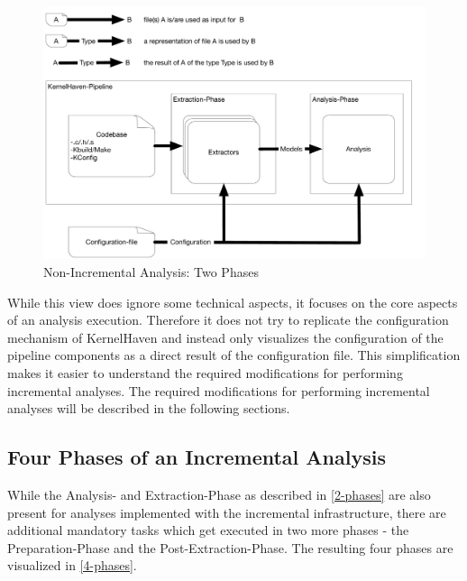 \documentclass[a4paper]{article}
\begin{document}
\begin{figure}[h] 
  \centering
  \begin{minipage}[b]{1\textwidth} 
    \caption[Non-Incremental Analysis: Two Phases]{Non-Incremental Analysis: Two Phases}\label{2-phases-image}
    \includegraphics[width=1\textwidth]{img/KernelHaven.pdf}
  \end{minipage}
\end{figure}


While this view does ignore some technical aspects, it focuses on the core aspects of an analysis execution. Therefore it does not try to replicate the configuration mechanism of KernelHaven and instead only visualizes the configuration of the pipeline components as a direct result of the configuration file. This simplification makes it easier to understand the required modifications for performing incremental analyses. The required modifications for performing incremental analyses will be described in the following sections.

\subsection{Four Phases of an Incremental Analysis}

While the Analysis- and Extraction-Phase as described in \autoref{2-phases} are also present for analyses implemented with the incremental infrastructure, there are additional mandatory tasks which get executed in two more phases - the Preparation-Phase and the Post-Extraction-Phase. The resulting four phases are visualized in \autoref{4-phases}.
\end{document}
